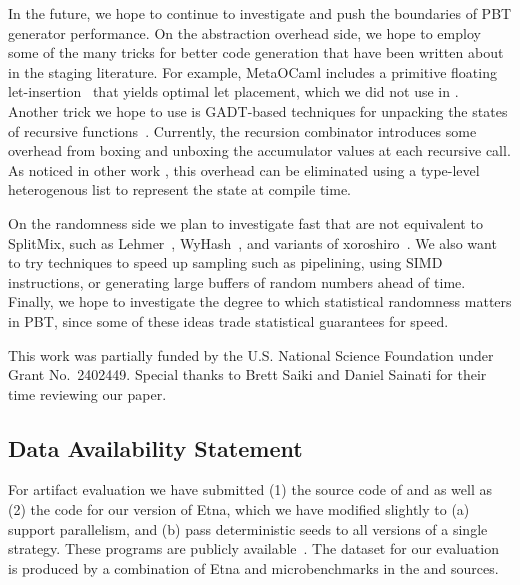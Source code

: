 \documentclass[acmsmall]{acmart}
\theoremstyle{definition}
\begin{document}
In the future, we hope to continue to investigate and push the boundaries of
PBT generator performance.
%
On the abstraction overhead side, we hope to employ some of the many tricks for better code generation that have been written
about in the staging literature. For example, MetaOCaml includes a primitive floating let-insertion~\cite{kiselyov2022letrecinsertioneffects} that yields optimal let placement,
which we did not use in \camlname{}.
Another trick we hope to use is GADT-based techniques for unpacking the states of recursive functions~\cite{kovacs24}. Currently, the \camlname{}
recursion combinator introduces some overhead from boxing and unboxing the accumulator values at each recursive call. As noticed in other work \cite{kovacs24}, this
overhead can be eliminated using a type-level heterogenous list to represent the state at compile time.

On the randomness side we plan to investigate fast \rands{} that are not equivalent to SplitMix, such as Lehmer~\cite{lehmerrng}, WyHash~\cite{wyrand},
and variants of xoroshiro~\cite{xorshiro}. We also want to try techniques to speed up sampling such as pipelining, using SIMD instructions,
or generating large buffers of random numbers ahead of time. Finally, we hope to investigate the degree to which statistical randomness
matters in PBT, since some of these ideas trade statistical guarantees for speed.
\begin{acks}
This work was partially funded by the U.S. National Science Foundation under Grant No.~2402449. Special thanks to Brett Saiki and Daniel Sainati for their time reviewing our paper.
\end{acks}

\subsection*{Data Availability Statement}
For artifact evaluation we have submitted (1) the source code of \camlname{} and \scalaname{} as well as (2) the code for our version of Etna,
which we have modified slightly to (a) support parallelism, and (b) pass deterministic seeds to all versions of a single strategy.
These programs are publicly available~\cite{artifact}.
The dataset for our evaluation is produced by a combination of Etna and microbenchmarks in the \camlname{} and \scalaname{} sources.




\end{document}
